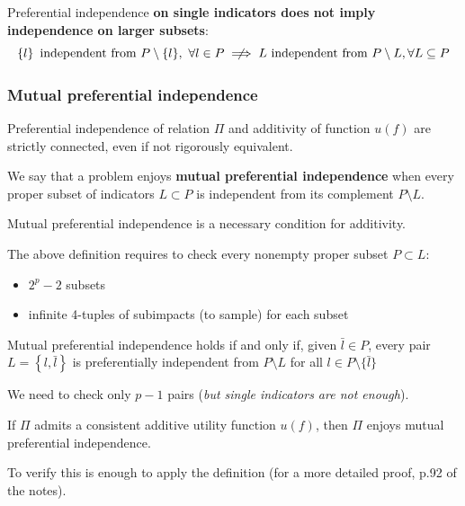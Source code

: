 Preferential independence \textbf{on single indicators does not imply independence on larger subsets}: 
$$ \left\{l\right\} \text{ independent from } P \setminus \{l\}, \ \forall l \in P \centernot \implies L \text{ independent from } P \setminus L, \forall L \subseteq P $$

\subsubsection{Mutual preferential independence}

Preferential independence of relation $\Pi$ and additivity of function $u(f)$ are strictly connected, even if not rigorously equivalent. \\

\begin{definition}
	We say that a problem enjoys \textbf{mutual preferential independence} when every proper subset of indicators $L \subset P$ is independent from its complement $P \setminus L$.
\end{definition}

Mutual preferential independence is a necessary condition for additivity.

The above definition requires to check every nonempty proper subset $P \subset L$: 
\begin{itemize}
	\item $2^p - 2$ subsets
	
	\item infinite 4-tuples of subimpacts (to sample) for each subset \\
\end{itemize}

\begin{theo}
	Mutual preferential independence holds if and only if, given $\bar l \in P$, every pair $L = \left\{l, \bar l \right\}$ is preferentially independent from $P \setminus L$ for all $l \in P \setminus \{\bar l\}$
\end{theo}

We need to check only $p-1$ pairs (\textit{but single indicators are not enough}). \\

\begin{theo}
	If $\Pi$ admits a consistent additive utility function $u(f)$, then $\Pi$ enjoys mutual preferential independence.
\end{theo}

To verify this is enough to apply the definition (for a more detailed proof, p.92 of the notes).

